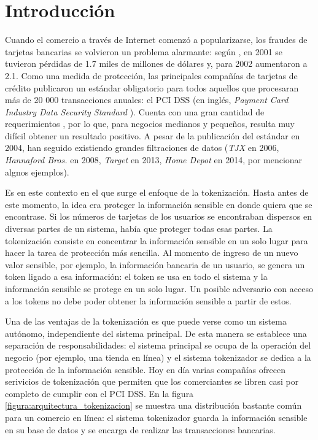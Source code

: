 %
%

\section{Introducción}


Cuando el comercio a través de Internet comenzó a popularizarse, los fraudes de
tarjetas bancarias se volvieron un problema alarmante: según \cite{wallethub},
en 2001 se tuvieron pérdidas de 1.7 miles de millones de dólares y, para 2002
aumentaron a 2.1. Como una medida de protección, las principales compañías de
tarjetas de crédito publicaron un estándar obligatorio para todos aquellos que
procesaran más de 20 000 transacciones anuales: el PCI DSS (en inglés,
\textit{Payment Card Industry Data Security Standard} \cite{pci_dss}). Cuenta
con una gran cantidad de requerimientos \cite{uk_association}
\cite{search_security}, por lo que, para negocios medianos y pequeños, resulta
muy difícil obtener un resultado positivo. A pesar de la publicación del
estándar en 2004, han seguido existiendo grandes filtraciones de datos
(\textit{TJX} en 2006, \textit{Hannaford Bros.} en 2008, \textit{Target} en
2013, \textit{Home Depot} en 2014, por mencionar algnos ejemplos).


Es en este contexto en el que surge el enfoque de la tokenización. Hasta antes
de este momento, la idea era proteger la información sensible en donde quiera
que se encontrase. Si los números de tarjetas de los usuarios se encontraban
dispersos en diversas partes de un sistema, había que proteger todas esas partes.
La tokenización consiste en concentrar la información sensible en un solo lugar
para hacer la tarea de protección más sencilla. Al momento de ingreso de un
nuevo valor sensible, por ejemplo, la información bancaria de un usuario, se
genera un token ligado a esa información: el token se usa en todo el sistema y
la información sensible se protege en un solo lugar. Un posible adversario con
acceso a los tokens no debe poder obtener la información sensible a partir de
estos.

Una de las ventajas de la tokenización es que puede verse como un sistema
autónomo, independiente del sistema principal. De esta manera se establece una
separación de responsabilidades: el sistema principal se ocupa de la operación
del negocio (por ejemplo, una tienda en línea) y el sistema tokenizador se
dedica a la protección de la información sensible. Hoy en día varias compañías
ofrecen serivicios de tokenización que permiten que los comerciantes se libren
casi por completo de cumplir con el PCI DSS. En la figura
\ref{figura:arquitectura_tokenizacion} se muestra una distribución bastante
común para un comercio en línea: el sistema tokenizador guarda la información
sensible en su base de datos y se encarga de realizar las transacciones
bancarias.

